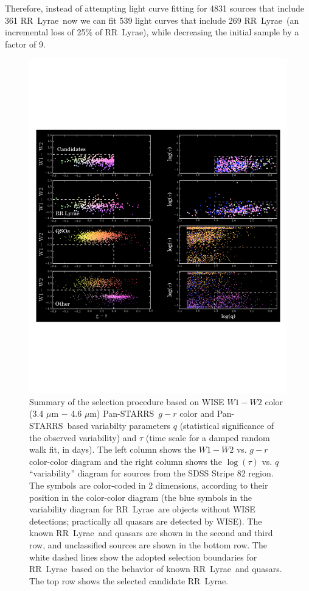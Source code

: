 \documentclass[12pt, preprint]{aastex}
\def\PS  {\hbox{Pan-STARRS}}
\def\RR  {\hbox{RR Lyrae}}
\begin{document}
Therefore, instead of attempting light curve fitting for 4831 sources that include
361 \RR\, now we can fit 539 light curves that include 269 \RR\ (an incremental loss 
of 25\% of \RR), while decreasing the initial sample by a factor of 9. 


\begin{figure}[!t]
\vskip -1.5in
\hskip -0.13in
\includegraphics[width=1.05\hsize,clip]{plotSelection.pdf}
\vskip -1.7in
\caption{Summary of the selection procedure based on WISE $W1-W2$ color (3.4 $\mu$m $-$ 4.6 $\mu$m)
\PS\ $g-r$ color and \PS\ based variabilty parameters $q$ (statistical significance of the observed variability)
and $\tau$ (time scale for a damped random walk fit, in days). The left column shows the $W1-W2$ vs. $g-r$
color-color diagram and the right column shows the $\log(\tau)$ vs. $q$ ``variability'' diagram for sources
from the SDSS Stripe 82 region. The symbols are color-coded in 2 dimensions, according to their position in 
the color-color diagram (the blue symbols in the variability diagram for \RR\ are objects without WISE detections;
practically all quasars are detected by WISE). 
The known \RR\ and quasars are shown in the second and third row, and unclassified sources are shown in the 
bottom row. The white dashed lines show the adopted selection boundaries for \RR\  based on the behavior of 
known \RR\ and quasars. The top row shows the selected candidate \RR.} 
\label{Fig:selection}
\end{figure}
\end{document}
